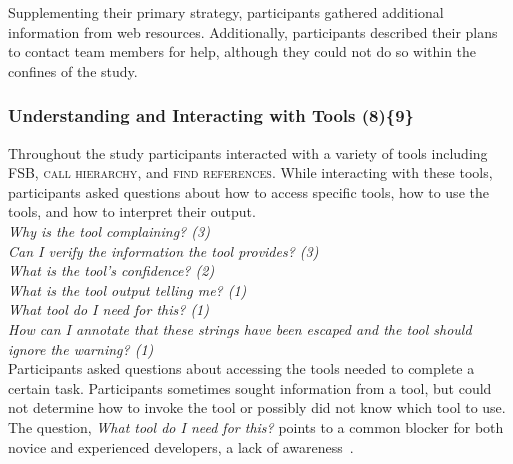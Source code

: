 \documentclass[10pt,journal,compsoc]{IEEEtran}
\begin{document}
Supplementing their primary strategy, participants gathered additional information from web resources.
Additionally, participants described their plans to contact team members for help, although they could not do so within the confines of the study.




\subsubsection{Understanding and Interacting with Tools (8)\{9\}}

\label{uit}

Throughout the study participants interacted with a variety of tools including FSB, \textsc{call hierarchy}, and \textsc{find references}. 
While interacting with these tools, participants asked questions about how to access specific tools, how to use the tools, and how to interpret their output. 
\\

\noindent\emph{Why is the tool complaining? (3)} \\
\emph{Can I verify the information the tool provides? (3)} \\
\emph{What is the tool's confidence? (2)} \\
\emph{What is the tool output telling me? (1)} \\
\emph{What tool do I need for this? (1)} \\ 
\emph{How can I annotate that these strings have been escaped and the tool should ignore the warning? (1)}
\\

Participants asked questions about accessing the tools needed to complete a certain task.
Participants sometimes sought information from a tool, but could not determine how to invoke the tool or possibly did not know which tool to use. 
The question, \emph{What tool do I need for this?} points to a common blocker for both novice and experienced developers, a lack of awareness~\cite{murphy-Hill2012fluency}.
\end{document}
